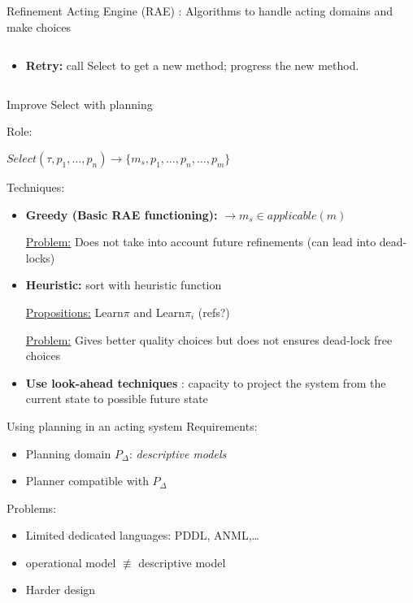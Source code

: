 \begin{frame}{Refinement Acting Engine (RAE)\cite{ghallabAutomatedPlanningActing2016} : Algorithms to handle acting domains and make choices}
\begin{columns}
\begin{column}{0.65\textwidth}
\begin{itemize}
            \item \textbf{Retry:} call Select to get a new method; progress the new method.
        \end{itemize}
    \end{column}
\end{columns}

    
\end{frame}

\begin{frame}{Improve Select with planning}
    \begin{center}
        
    Role:
    
    $Select(\tau, p_1,\dots,p_n) \rightarrow \{m_s, p_1, \dots, p_n,\dots,p_m\}$

    \end{center}

    Techniques:
    \begin{itemize}

    \item \textbf{Greedy (Basic RAE functioning):} $\rightarrow m_s \in applicable(m)$
    \pause
    
    \underline{Problem:} Does not take into account future refinements (can lead into dead-locks)
    \pause
    
    \item \textbf{Heuristic:} sort with heuristic function
    \pause
    
    \underline{Propositions:} Learn$\pi$ and Learn$\pi_i$ (refs?)
    \pause
    
    \underline{Problem:} Gives better quality choices but does not ensures dead-lock free choices
    \pause
    \item \textbf<5->{Use look-ahead techniques} : capacity to project the system from the current state to possible future state

    \end{itemize}
\end{frame}
\begin{frame}{Using planning in an acting system}
    Requirements:
    \begin{itemize}
        \item Planning domain $P_\Delta$: \textit{descriptive models}
        \item Planner compatible with $P_\Delta$
    \end{itemize}
    Problems: 
    \begin{itemize}
        \item Limited dedicated languages: PDDL, ANML,\dots
        \item operational model $\not\equiv$ descriptive model
        \item Harder design 
    \end{itemize}

\end{frame}
